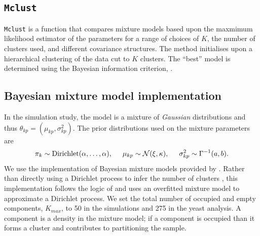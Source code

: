 \documentclass{bioinfo}
\begin{document}
\begin{methods}
\subsection{\texttt{Mclust}}
\texttt{Mclust} \citep{mclust2016scrucca} is a function that compares mixture models based upon the maxmimum likelihood estimator of the parameters for a range of choices of $K$, the number of clusters used, and different covariance structures. The method initialises upon a hierarchical clustering of the data cut to $K$ clusters. The ``best'' model is determined using the Bayesian information criterion, \citep[\textbf{BIC},][]{schwarz1978estimating}.
\end{methods}

\subsection{Bayesian mixture model implementation}
In the simulation study, the model is a mixture of \emph{Gaussian} distributions and thus \(\theta_{kp}=(\mu_{kp}, \sigma^2_{kp})\). The prior distributions used on the mixture parameters are
\begin{align}
	\pi_k \sim \textrm{Dirichlet}(\alpha, \ldots, \alpha), \hspace{0.5cm} \mu_{kp} \sim \mathcal{N}(\xi, \kappa), \hspace{0.5cm} \sigma_{kp}^2 \sim \Gamma^{-1}(a, b). \nonumber
\end{align}
We use the implementation of Bayesian mixture models provided by \cite{mason2016mdi}.
Rather than directly using a Dirichlet process to infer the number of clusters \citep[for example by using Reversible Jump MCMC as described by][]{richardson1997bayesian}, this implementation follows the logic of \cite{van2015overfitting} and uses an overfitted mixture model to approximate a Dirichlet process. We set the total number of occupied and empty components, $K_{max}$, to 50 in the simulations and 275 in the yeast analysis. A component is a density in the mixture model; if a component is occupied than it forms a cluster and contributes to partitioning the sample.
\end{document}
